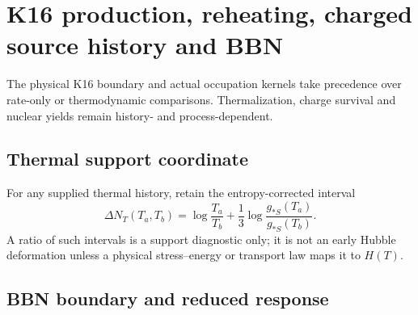 \documentclass[12pt,a4paper]{article}
\begin{document}


\section{K16 production, reheating, charged source history and BBN}
\label{p6b:sec:organized-b4}
The physical K16 boundary and actual occupation kernels take precedence over rate-only or thermodynamic comparisons. Thermalization, charge survival and nuclear yields remain history- and process-dependent.

\subsection{Thermal support coordinate}
\label{p9:sec:thermal-support-cross-reference}
For any supplied thermal history, retain the entropy-corrected interval
\begin{equation}
\label{p9:eq:thermal-window-length}
\Delta N_T(T_a,T_b)
=\log\frac{T_a}{T_b}
+\frac13\log\frac{g_{*S}(T_a)}{g_{*S}(T_b)}.
\end{equation}
A ratio of such intervals is a support diagnostic only; it is not an early
Hubble deformation unless a physical stress--energy or transport law maps it
to \(H(T)\).

\subsection{BBN boundary and reduced response}
\label{p9:app:omegak}
\end{document}
